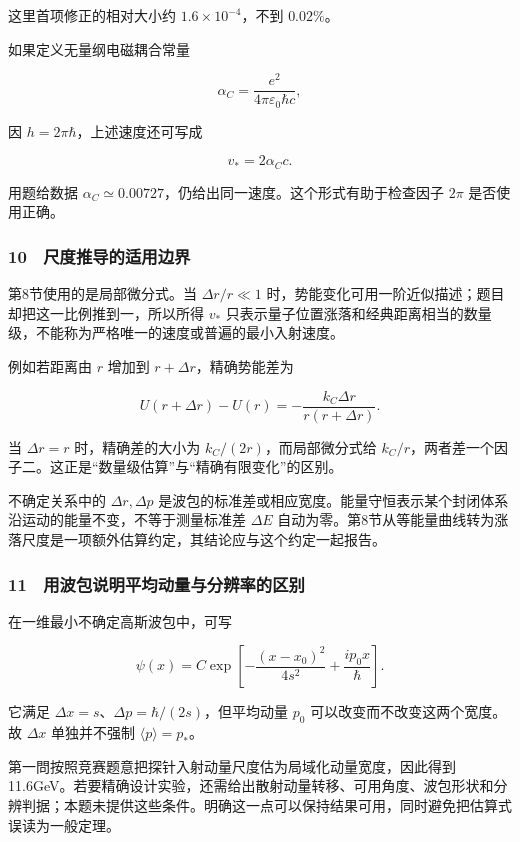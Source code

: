 \documentclass[12pt,a4paper,fontset=fandol]{ctexart}
\begin{document}
这里首项修正的相对大小约 \(1.6\times10^{-4}\)，不到 \(0.02\%\)。

如果定义无量纲电磁耦合常量

\[\alpha_C=\frac{e^2}{4\pi\varepsilon_0\hbar c},\]

因 \(h=2\pi\hbar\)，上述速度还可写成

\[\boxed{v_*=2\alpha_Cc.}\]

用题给数据
\(\alpha_C\simeq0.00727\)，仍给出同一速度。这个形式有助于检查因子
\(2\pi\) 是否使用正确。

\subsubsection{10　尺度推导的适用边界}\label{ux5c3aux5ea6ux63a8ux5bfcux7684ux9002ux7528ux8fb9ux754c}

第8节使用的是局部微分式。当 \(\Delta r/r\ll1\)
时，势能变化可用一阶近似描述；题目却把这一比例推到一，所以所得 \(v_*\)
只表示量子位置涨落和经典距离相当的数量级，不能称为严格唯一的速度或普遍的最小入射速度。

例如若距离由 \(r\) 增加到 \(r+\Delta r\)，精确势能差为

\[U(r+\Delta r)-U(r)
=-\frac{k_C\Delta r}{r(r+\Delta r)}.\]

当 \(\Delta r=r\) 时，精确差的大小为 \(k_C/(2r)\)，而局部微分式给
\(k_C/r\)，两者差一个因子二。这正是``数量级估算''与``精确有限变化''的区别。

不确定关系中的 \(\Delta r,\Delta p\)
是波包的标准差或相应宽度。能量守恒表示某个封闭体系沿运动的能量不变，不等于测量标准差
\(\Delta E\)
自动为零。第8节从等能量曲线转为涨落尺度是一项额外估算约定，其结论应与这个约定一起报告。

\subsubsection{11　用波包说明平均动量与分辨率的区别}\label{ux7528ux6ce2ux5305ux8bf4ux660eux5e73ux5747ux52a8ux91cfux4e0eux5206ux8fa8ux7387ux7684ux533aux522b}

在一维最小不确定高斯波包中，可写

\[\psi(x)=C\exp\left[-\frac{(x-x_0)^2}{4s^2}
+\frac{i p_0x}{\hbar}\right].\]

它满足 \(\Delta x=s\)、\(\Delta p=\hbar/(2s)\)，但平均动量 \(p_0\)
可以改变而不改变这两个宽度。故 \(\Delta x\) 单独并不强制
\(\langle p\rangle=p_*\)。

第一問按照竞赛题意把探针入射动量尺度估为局域化动量宽度，因此得到11.6GeV。若要精确设计实验，还需给出散射动量转移、可用角度、波包形状和分辨判据；本题未提供这些条件。明确这一点可以保持结果可用，同时避免把估算式误读为一般定理。
\end{document}
